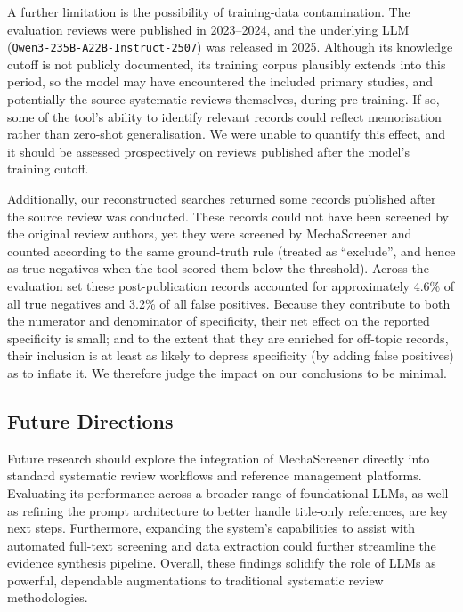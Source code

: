 \documentclass[11pt,a4paper]{article}
\begin{document}
A further limitation is the possibility of training-data contamination. The evaluation reviews were published in 2023--2024, and the underlying LLM (\texttt{Qwen3-235B-A22B-Instruct-2507}) was released in 2025. Although its knowledge cutoff is not publicly documented, its training corpus plausibly extends into this period, so the model may have encountered the included primary studies, and potentially the source systematic reviews themselves, during pre-training. If so, some of the tool's ability to identify relevant records could reflect memorisation rather than zero-shot generalisation. We were unable to quantify this effect, and it should be assessed prospectively on reviews published after the model's training cutoff.

Additionally, our reconstructed searches returned some records published after the source review was conducted. These records could not have been screened by the original review authors, yet they were screened by MechaScreener and counted according to the same ground-truth rule (treated as ``exclude'', and hence as true negatives when the tool scored them below the threshold). Across the evaluation set these post-publication records accounted for approximately 4.6\% of all true negatives and 3.2\% of all false positives. Because they contribute to both the numerator and denominator of specificity, their net effect on the reported specificity is small; and to the extent that they are enriched for off-topic records, their inclusion is at least as likely to depress specificity (by adding false positives) as to inflate it. We therefore judge the impact on our conclusions to be minimal.

\subsection{Future Directions}
Future research should explore the integration of MechaScreener directly into standard systematic review workflows and reference management platforms. Evaluating its performance across a broader range of foundational LLMs, as well as refining the prompt architecture to better handle title-only references, are key next steps. Furthermore, expanding the system's capabilities to assist with automated full-text screening and data extraction could further streamline the evidence synthesis pipeline. Overall, these findings solidify the role of LLMs as powerful, dependable augmentations to traditional systematic review methodologies.
\end{document}
